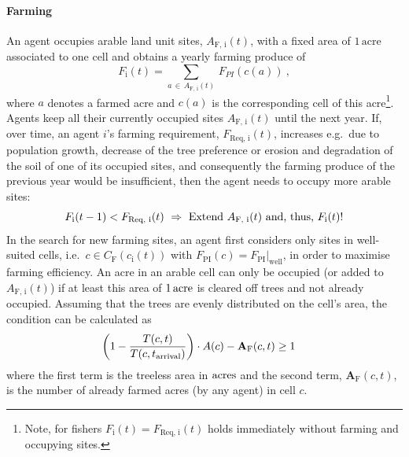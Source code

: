 \paragraph{Farming}
An agent occupies arable land unit sites, $A_\text{F, i}(t)$, with a fixed area of $1\, \text{acre}$ associated to one cell and obtains a yearly farming produce of
\begin{equation}\label{AProd}
F_\text{i}(t) = \sum_{a \, \in \, A_\text{F, i}(t)} \, F_{PI}(c(a))\ ,
\end{equation}
where $a$ denotes a farmed acre and $c(a)$ is the corresponding cell of this acre\footnote{Note, for fishers $F_\text{i}(t) = F_\text{Req, i}(t)$ holds immediately without farming and occupying sites.}.
Agents keep all their currently occupied sites $A_\text{F, i}(t)$ until the next year. %
If, over time, an agent $i$'s farming requirement, $F_\text{Req, i}(t)$, increases e.g.\ due to population growth, decrease of the tree preference or erosion and degradation of the soil of one of its occupied sites, and consequently the farming produce of the previous year would be insufficient, then the agent needs to occupy more arable sites: 
\begin{equation}
F_\text{i}(t-1) < F_\text{Req, i}(t) \ \Rightarrow \ \text{Extend } A_\text{F, i}(t) \text{ and, thus, } F_\text{i}(t) {\rm !}
\end{equation}
In the search for new farming sites, an agent first considers only sites in well-suited cells, i.e.\ $c \in C_\text{F}(c_\text{i}(t))$ with $F_\text{PI}(c)=F_\text{PI}|_\text{well}$, in order to maximise farming efficiency.
An acre in an arable cell can only be occupied (or added to $A_\text{F, i}(t)$) if at least this area of $1\, {\rm acre}$ is cleared off trees and not already occupied. 
Assuming that the trees are evenly distributed on the cell's area, the condition can be calculated as 
\begin{eqnarray}
\left( 1 - \frac{T(c,t)}{T(c,t_{\rm arrival})} \right) \cdot A(c) - \mathbf{A}_\text{F}(c, t) & \geq   1
\label{eq:BurningCond}
\end{eqnarray}
where the first term is the treeless area in ${\rm acres}$ and the second term, $\mathbf{A}_\text{F}(c, t)$, is the number of already farmed acres (by any agent) in cell $c$.%

